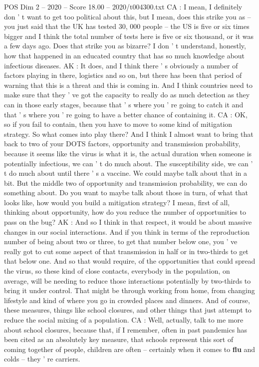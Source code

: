 \begin{textsample}{POS Dim 2 – 2020 – Score 18.00 – 2020/t004300.txt}
CA : I mean, I definitely don ' t want to get too political about this, but I mean, does this strike you as -- you just said that the UK has tested 30, 000 people -- the US is five or six times bigger and I think the total number of tests here is five or six thousand, or it was a few days ago.
Does that strike you as bizarre?
I don ' t understand, honestly, how that happened in an educated country that has so much knowledge about infectious diseases.
AK : It does, and I think there ' s obviously a number of factors playing in there, logistics and so on, but there has been that period of warning that this is a threat and this is coming in.
And I think countries need to make sure that they ' ve got the capacity to really do as much detection as they can in those early stages, because that ' s where you ' re going to catch it and that ' s where you ' re going to have a better chance of containing it.
CA : OK, so if you fail to contain, then you have to move to some kind of mitigation strategy.
So what comes into play there?
And I think I almost want to bring that back to two of your DOTS factors, opportunity and transmission probability, because it seems like the virus is what it is, the actual duration when someone is potentially infectious, we can ' t do much about.
The susceptibility side, we can ' t do much about until there ' s a vaccine.
We could maybe talk about that in a bit.
But the middle two of opportunity and transmission probability, we can do something about.
Do you want to maybe talk about those in turn, of what that looks like, how would you build a mitigation strategy?
I mean, first of all, thinking about opportunity, how do you reduce the number of opportunities to pass on the bug?
AK : And so I think in that respect, it would be about massive changes in our social interactions.
And if you think in terms of the reproduction number of being about two or three, to get that number below one, you ' ve really got to cut some aspect of that transmission in half or in two-thirds to get that below one.
And so that would require, of the opportunities that could spread the virus, so these kind of close contacts, everybody in the population, on average, will be needing to reduce those interactions potentially by two-thirds to bring it under control.
That might be through working from home, from changing lifestyle and kind of where you go in crowded places and dinners.
And of course, these measures, things like school closures, and other things that just attempt to reduce the social mixing of a population.
CA : Well, actually, talk to me more about school closures, because that, if I remember, often in past pandemics has been cited as an absolutely key measure, that schools represent this sort of coming together of people, children are often -- certainly when it comes to \textbf{flu} and colds -- they ' re carriers.

\end{textsample}
